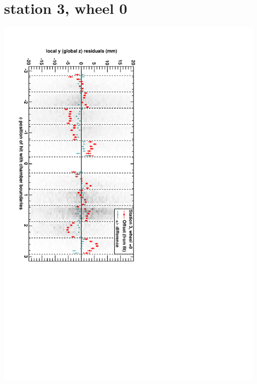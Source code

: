 \documentclass[compress]{beamer}
\begin{document}
\section*{station 3, wheel 0}
\begin{frame} \vfill \mbox{\hspace{-1 cm}\includegraphics[height=1.2\linewidth, angle=90]{DTzVsPhi_st3_whC.pdf}} \end{frame}
\end{document}

